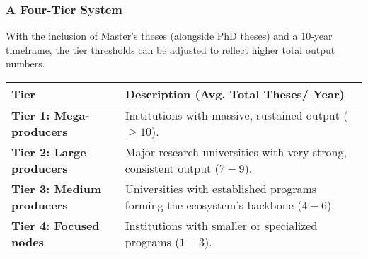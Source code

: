 \documentclass[aspectratio=169]{beamer}
\begin{document}
\begin{frame}
    \frametitle{A Four-Tier System}
    
    With the inclusion of Master's theses (alongside PhD theses) and a 10-year timeframe, the tier thresholds can be adjusted to reflect higher total output numbers.

    \begin{center}
    \begin{tabularx}{0.9\textwidth}{l >{\RaggedRight}X}
        \toprule
        \textbf{Tier} & \textbf{Description (Avg. Total Theses/ Year)} \\
        \midrule
        \textbf{Tier 1: Mega-producers} & Institutions with massive, sustained output ($\geq 10$). \\
        \addlinespace
        \textbf{Tier 2: Large producers} & Major research universities with very strong, consistent output ($7-9$). \\
        \addlinespace
        \textbf{Tier 3: Medium producers} & Universities with established programs forming the ecosystem's backbone ($4-6$). \\
        \addlinespace
        \textbf{Tier 4: Focused nodes} & Institutions with smaller or specialized programs ($1-3$). \\
        \bottomrule
    \end{tabularx}
    \end{center}
\end{frame}
\end{document}
